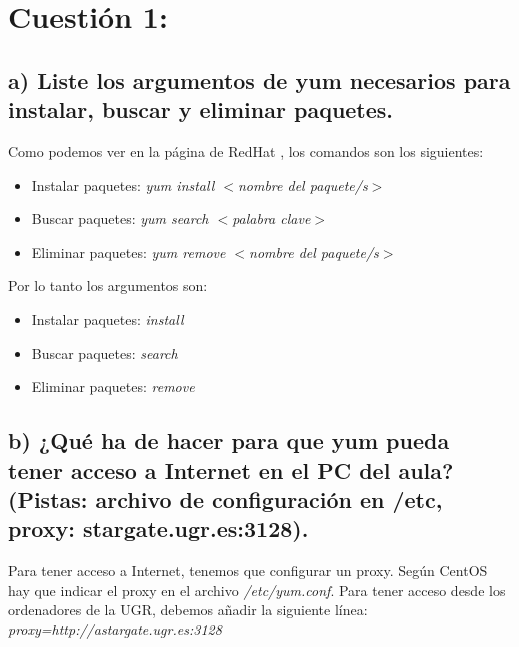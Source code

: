 \documentclass[a4paper,titlepage,12pt]{scrartcl}	%
\numberwithin{figure}{section} %
\numberwithin{table}{section} %
\begin{document}
	\tableofcontents
	\clearpage
	\listoffigures %
	\clearpage
	
	\section[Cuestión 1:]{Cuestión 1:}
	
	\subsection[a) Liste los argumentos de yum necesarios para instalar, buscar y eliminar paquetes.]{a) Liste los argumentos de yum necesarios para instalar, buscar y eliminar paquetes.}
	
	Como podemos ver en la página de RedHat \cite{yum}, los comandos son los siguientes:
	\begin{itemize}
		\item Instalar paquetes: \textit{yum install $<$nombre del paquete/s$>$}
		\item Buscar paquetes: \textit{yum search $<$palabra clave$>$}
		\item Eliminar paquetes: \textit{yum remove $<$nombre del paquete/s$>$}
	\end{itemize}
	
	Por lo tanto los argumentos son:
	\begin{itemize}
		\item Instalar paquetes: \textit{install}
		\item Buscar paquetes: \textit{search}
		\item Eliminar paquetes: \textit{remove}
	\end{itemize} 
	
	\subsection[b) ¿Qué ha de hacer para que yum pueda tener acceso a Internet en el PC del aula?(Pistas: archivo de configuración en /etc, proxy: stargate.ugr.es:3128).]{b) ¿Qué ha de hacer para que yum pueda tener acceso a Internet en el PC del aula?(Pistas: archivo de configuración en /etc, proxy: stargate.ugr.es:3128).}
	
	Para tener acceso a Internet, tenemos que configurar un proxy. Según CentOS \cite{yumproxy} hay que indicar el proxy en el archivo \textit{/etc/yum.conf}. Para tener acceso desde los ordenadores de la UGR, debemos añadir la siguiente línea: \textit{proxy=http://astargate.ugr.es:3128}
	
\end{document}
